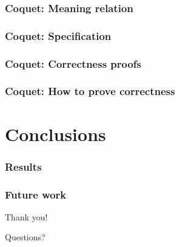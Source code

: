 \documentclass{beamer}
\begin{document}
            \begin{frame}
                \frametitle{Coquet: Meaning relation}
            \end{frame}

            \begin{frame}
                \frametitle{Coquet: Specification}
            \end{frame}

            \begin{frame}
                \frametitle{Coquet: Correctness proofs}
            \end{frame}

            \begin{frame}
                \frametitle{Coquet: How to prove correctness}
            \end{frame}



    \section{Conclusions}
    \label{sec:conclusions}
        \frame{\sectionpage}

        \begin{frame}
            \frametitle{Results}
        \end{frame}

        \begin{frame}
            \frametitle{Future work}
        \end{frame}


        \begin{frame}[plain]
            \begin{center}
                \par{\Huge{Thank you!}}
                \vspace{2.0cm}
                \par{\Huge{Questions?}}
            \end{center}
        \end{frame}
\end{document}
